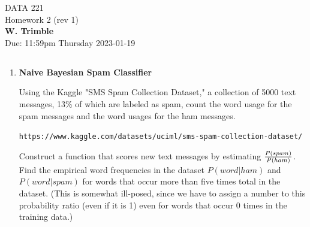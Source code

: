\documentclass[12pt]{book}
\theoremstyle{definition}
\begin{document}
\begin{center}
{\Large DATA 221 \\  Homework 2  (rev 1)}\\
\textbf{W. Trimble}\\ %
Due: 11:59pm  Thursday 2023-01-19 
\end{center}

\vspace{0.2 cm}

\subsection*{   }

\begin{enumerate}

%


\item


\textbf{Naive Bayesian Spam Classifier}

Using the Kaggle "SMS Spam Collection Dataset," a collection of 5000 text messages, 13\% of which are labeled as spam, count the word usage for the spam messages and the word usages for the ham messages.

\texttt{https://www.kaggle.com/datasets/uciml/sms-spam-collection-dataset/}

Construct a function that scores new text messages by estimating $ {P (spam ) \over P(ham) } $.  Find the empirical word frequencies in the dataset $P (word | ham)$ and $P( word | spam ) $ 
for words that occur more than five times total in the dataset.
(This is somewhat ill-posed, since we have to assign a number to this probability ratio (even if it is 1) even for words that occur 0 times in the training data.)


\end{enumerate}
\end{document}
